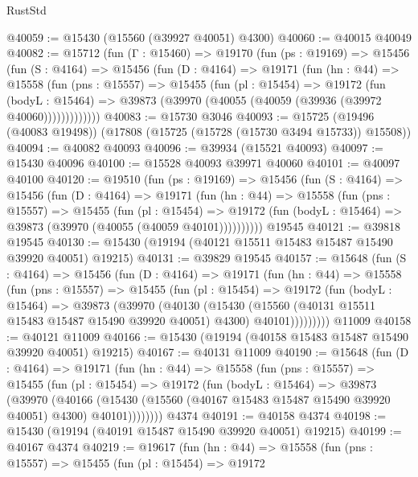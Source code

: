 \begin{lexlean}{RustStd}
\begin{coremodule}
@40059 := @15430 (@15560 (@39927 @40051) @4300)
@40060 := @40015 @40049
@40082 := @15712
    (fun (Γ : @15460) =>
    @19170
      (fun (ps : @19169) =>
      @15456
        (fun (S : @4164) =>
        @15456
          (fun (D : @4164) =>
          @19171
            (fun (hn : @44) =>
            @15558
              (fun (pns : @15557) =>
              @15455
                (fun (pl : @15454) =>
                @19172
                  (fun (bodyL : @15464) =>
                  @39873 (@39970 (@40055 (@40059 (@39936 (@39972 @40060)))))))))))))
@40083 := @15730 @3046
@40093 := @15725 (@19496 (@40083 @19498)) (@17808 (@15725 (@15728 (@15730 @3494 @15733)) @15508))
@40094 := @40082 @40093
@40096 := @39934 (@15521 @40093)
@40097 := @15430 @40096
@40100 := @15528 @40093 @39971 @40060
@40101 := @40097 @40100
@40120 := @19510
    (fun (ps : @19169) =>
    @15456
      (fun (S : @4164) =>
      @15456
        (fun (D : @4164) =>
        @19171
          (fun (hn : @44) =>
          @15558
            (fun (pns : @15557) =>
            @15455
              (fun (pl : @15454) =>
              @19172 (fun (bodyL : @15464) => @39873 (@39970 (@40055 (@40059 @40101))))))))))
    @19545
@40121 := @39818 @19545
@40130 := @15430 (@19194 (@40121 @15511 @15483 @15487 @15490 @39920 @40051) @19215)
@40131 := @39829 @19545
@40157 := @15648
    (fun (S : @4164) =>
    @15456
      (fun (D : @4164) =>
      @19171
        (fun (hn : @44) =>
        @15558
          (fun (pns : @15557) =>
          @15455
            (fun (pl : @15454) =>
            @19172
              (fun (bodyL : @15464) =>
              @39873
                (@39970
                  (@40130
                    (@15430
                      (@15560 (@40131 @15511 @15483 @15487 @15490 @39920 @40051) @4300)
                      @40101)))))))))
    @11009
@40158 := @40121 @11009
@40166 := @15430 (@19194 (@40158 @15483 @15487 @15490 @39920 @40051) @19215)
@40167 := @40131 @11009
@40190 := @15648
    (fun (D : @4164) =>
    @19171
      (fun (hn : @44) =>
      @15558
        (fun (pns : @15557) =>
        @15455
          (fun (pl : @15454) =>
          @19172
            (fun (bodyL : @15464) =>
            @39873
              (@39970
                (@40166
                  (@15430 (@15560 (@40167 @15483 @15487 @15490 @39920 @40051) @4300) @40101))))))))
    @4374
@40191 := @40158 @4374
@40198 := @15430 (@19194 (@40191 @15487 @15490 @39920 @40051) @19215)
@40199 := @40167 @4374
@40219 := @19617
    (fun (hn : @44) =>
    @15558
      (fun (pns : @15557) =>
      @15455
        (fun (pl : @15454) =>
        @19172

\end{coremodule}
\end{lexlean}

